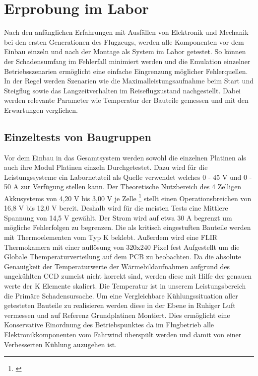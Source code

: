 \chapter{Erprobung im Labor}\label{cha:Erprobung im Labor}

Nach den anfänglichen Erfahrungen mit Ausfällen von Elektronik und Mechanik bei den ersten Generationen des Flugzeugs, werden alle Komponenten vor dem Einbau einzeln und nach der Montage als System im Labor getestet.
So können der Schadensumfang im Fehlerfall minimiert werden und die Emulation einzelner Betriebsszenarien ermöglicht eine einfache Eingrenzung möglicher Fehlerquellen.
In der Regel werden Szenarien wie die Maximalleistungsaufnahme beim Start und Steigflug sowie das Langzeitverhalten im Reiseflugzustand nachgestellt. Dabei werden relevante Parameter wie Temperatur der Bauteile gemessen und mit den Erwartungen verglichen.

\section{Einzeltests von Baugruppen}

Vor dem Einbau in das Gesamtsystem werden sowohl die einzelnen Platinen als auch ihre Modul Platinen einzeln Durchgetestet.
Dazu wird für die Leistungssysteme ein Labornetzteil als Quelle verwendet welches 0 - 45 V und 0 - 50 A zur Verfügung stellen kann.
Der Theoretische Nutzbereich des 4 Zelligen Akkusystems von 4,20 V bis 3,00 V je Zelle \footnote{\cite[Seite~1.12f.]{Reddy2010}} stellt einen Operationsbreichen von 16,8 V bis 12,0 V bereit. Deshalb wird für die meisten Tests eine Mittlere Spannung von 14,5 V gewählt. Der Strom wird auf etwa 30 A begrenzt um mögliche Fehlerfolgen zu begrenzen.
Die als kritisch eingestuften Bauteile werden mit Thermoelementen vom Typ K beklebt. Außerdem wird eine FLIR Thermokamera mit einer auflösung von 320x240 Pixel fest Aufgestellt um die Globale Themperaturverteilung auf dem PCB zu beobachten.
Da die absolute Genauigkeit der Temperaturwerte der Wärmebildaufnahmen aufgrund des ungekühlten CCD zumeist nicht korrekt sind, werden diese mit Hilfe der genauen werte der K Elemente skaliert.
Die Temperatur ist in unserem Leistungsbereich die Primäre Schadensursache. 
Um eine Vergleichbare Kühlungssituation aller getesteten Bauteile zu realisieren werden diese in der Ebene in Ruhiger Luft vermessen und auf Referenz Grundplatinen Montiert.
Dies ermöglicht eine Konservative Einordnung des Betriebspunktes da im Flugbetrieb alle Elektronikkomponenten vom Fahrwind überspült werden und damit von einer Verbesserten Kühlung auzugehen ist.

